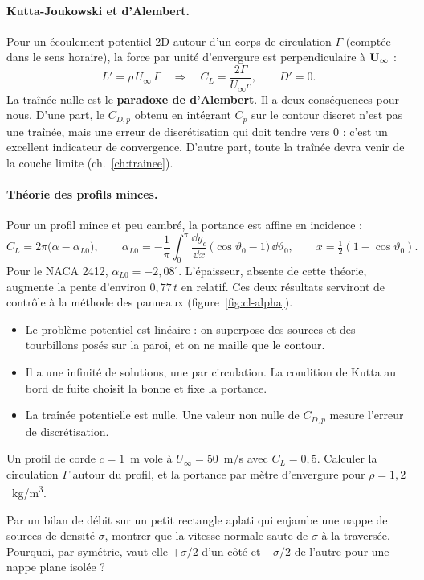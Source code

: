 \paragraph{Kutta-Joukowski et d'Alembert.} Pour un écoulement potentiel 2D autour d'un corps de circulation $\Gamma$ (comptée dans le sens horaire), la force par unité d'envergure est perpendiculaire à $\mathbf{U}_\infty$ :
\[
L'=\rho\,U_\infty\,\Gamma\quad\Longrightarrow\quad C_L=\frac{2\Gamma}{U_\infty c},\qquad D'=0 .
\]
La traînée nulle est le \textbf{paradoxe de d'Alembert}. Il a deux conséquences pour nous. D'une part, le $C_{D,p}$ obtenu en intégrant $C_p$ sur le contour discret n'est pas une traînée, mais une erreur de discrétisation qui doit tendre vers 0 : c'est un excellent indicateur de convergence. D'autre part, toute la traînée devra venir de la couche limite (ch.~\ref{ch:trainee}).

\paragraph{Théorie des profils minces.} Pour un profil mince et peu cambré, la portance est affine en incidence :
\[
C_L=2\pi\big(\alpha-\alpha_{L0}\big),\qquad
\alpha_{L0}=-\frac1\pi\int_0^\pi\frac{\dd y_c}{\dd x}\,\big(\cos\vartheta_0-1\big)\,\dd\vartheta_0,\qquad x=\tfrac12(1-\cos\vartheta_0).
\]
Pour le NACA 2412, $\alpha_{L0}=-2{,}08^\circ$. L'épaisseur, absente de cette théorie, augmente la pente d'environ $0{,}77\,t$ en relatif. Ces deux résultats serviront de contrôle à la méthode des panneaux (figure~\ref{fig:cl-alpha}).

\begin{resultat}
\begin{itemize}
\item Le problème potentiel est linéaire : on superpose des sources et des tourbillons posés sur la paroi, et on ne maille que le contour.
\item Il a une infinité de solutions, une par circulation. La condition de Kutta au bord de fuite choisit la bonne et fixe la portance.
\item La traînée potentielle est nulle. Une valeur non nulle de $C_{D,p}$ mesure l'erreur de discrétisation.
\end{itemize}
\end{resultat}

\exercices
\begin{exercice}
Un profil de corde $c=1$~m vole à $U_\infty=50$~m/s avec $C_L=0{,}5$. Calculer la circulation $\Gamma$ autour du profil, et la portance par mètre d'envergure pour $\rho=1{,}2$~kg/m\textsuperscript{3}.
\end{exercice}
\begin{exercice}
Par un bilan de débit sur un petit rectangle aplati qui enjambe une nappe de sources de densité $\sigma$, montrer que la vitesse normale saute de $\sigma$ à la traversée. Pourquoi, par symétrie, vaut-elle $+\sigma/2$ d'un côté et $-\sigma/2$ de l'autre pour une nappe plane isolée ?
\end{exercice}
